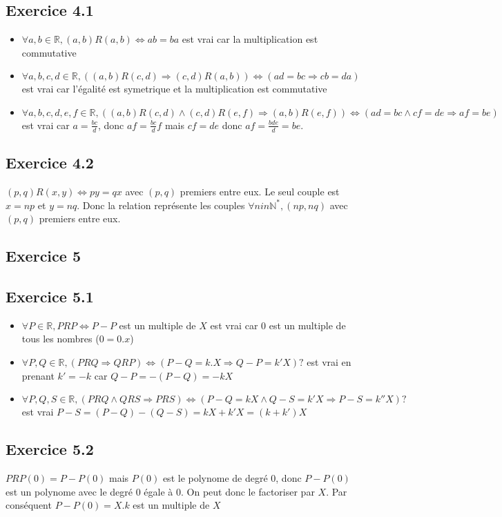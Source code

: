 \documentclass[]{book}
\theoremstyle{definition}
\newcommand{\bb}[1]{\mathbb{#1}}
\newcommand{\R}{\bb{R}}
\newcommand{\N}{\bb{N}}
\begin{document}
\subsection*{Exercice 4.1}
\begin{itemize}
\item $\forall a,b \in \R, (a,b)R(a,b) \Leftrightarrow ab = ba$ est vrai car la multiplication est commutative
\item $\forall a,b,c,d \in \R, ((a,b)R(c,d) \Rightarrow (c,d)R(a,b)) \Leftrightarrow (ad = bc \Rightarrow cb = da)$ est vrai car l'\'egalit\'e est symetrique et la multiplication est commutative
\item $\forall a,b,c,d,e,f \in \R, ((a,b)R(c,d) \wedge (c,d)R(e,f) \Rightarrow (a,b)R(e,f)) \Leftrightarrow (ad = bc \wedge cf = de \Rightarrow af = be)$ est vrai car $a = \frac{bc}{d}$, donc $af = \frac{bc}{d}f$ mais $cf=de$ donc $af = \frac{bde}{d} = be$. 
\end{itemize}

\subsection*{Exercice 4.2}
$(p,q)R(x,y) \Leftrightarrow py = qx$ avec $(p,q)$ premiers entre eux. Le seul couple est $x=np$ et $y=nq$. Donc la relation repr\'esente les couples $\forall n in \N^{*},(np,nq)$ avec $(p,q)$ premiers entre eux.


\subsection*{Exercice 5}
\subsection*{Exercice 5.1}
\begin{itemize}
\item $\forall P \in \R, PRP \Leftrightarrow P-P$ est un multiple de $X$ est vrai car 0 est un multiple de tous les nombres ($0 = 0.x$)
\item $\forall P,Q \in \R, (PRQ \Rightarrow QRP) \Leftrightarrow (P-Q = k.X \Rightarrow Q-P = k'X)?$ est vrai en prenant $k'=-k$ car $Q-P = -(P-Q) = -kX$ 
\item $\forall P,Q,S \in \R, (PRQ \wedge QRS \Rightarrow PRS) \Leftrightarrow (P-Q = kX \wedge Q-S = k'X \Rightarrow P-S = k''X)?$ est vrai $P-S = (P-Q) - (Q-S) = kX + k'X = (k+k')X$
\end{itemize}

\subsection*{Exercice 5.2}
$PRP(0) = P - P(0)$ mais $P(0)$ est le polynome de degr\'e 0, donc $P-P(0)$ est un polynome avec le degr\'e 0 \'egale \`a 0. On peut donc le factoriser par $X$. Par cons\'equent $P-P(0)=X.k$ est un multiple de $X$
\end{document}
